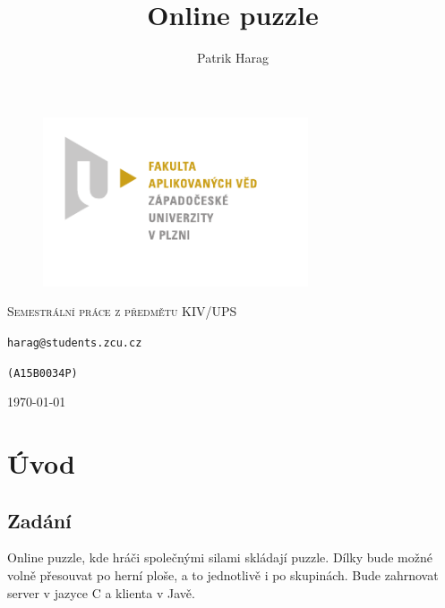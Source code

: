 \documentclass[12pt, a4paper]{report}
\title{Online puzzle}
\author{Patrik Harag}
\makeatletter
\def \thesubtitle {Semestrální práce z předmětu KIV/UPS}
\def \theauthoremail {harag@students.zcu.cz}
\def \theauthorid {(A15B0034P)}
\makeatother
\begin{document}
\begin{titlepage}
	\begin{figure}
		\includegraphics[height=50mm]{img-fav-logo}
	\end{figure}
	
	\centering
	{\large \hspace{1mm} \par} %
	\vspace{15ex}
	
	{\scshape\Large \thesubtitle \par}
	\vspace{1.5ex}
	{\huge\bfseries \thetitle \par}
	\vspace{2ex}
	{\Large\itshape \theauthor \par}
	\vspace{2ex}
	{\texttt{\theauthoremail} \par}
	\vspace{1ex}
	{\texttt{\theauthorid} \par}
	\vspace{5ex}
	
	\vfill

	{\large \today\par}
\end{titlepage}

\setcounter{page}{0} 
\tableofcontents
\thispagestyle{empty}


\chapter{Úvod}
\section{Zadání}
Online puzzle, kde hráči společnými silami skládají puzzle. Dílky bude možné volně přesouvat po herní ploše, a to jednotlivě i po skupinách. Bude zahrnovat server v jazyce C a klienta v Javě.
\end{document}
